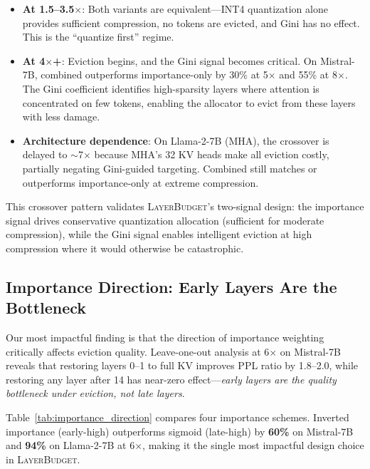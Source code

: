 \documentclass{article}
\newcommand{\layerbudget}{\textsc{LayerBudget}\xspace}
\begin{document}
\begin{itemize}
    \item \textbf{At 1.5--3.5$\times$}: Both variants are equivalent---INT4 quantization alone provides sufficient compression, no tokens are evicted, and Gini has no effect.
    This is the ``quantize first'' regime.
    \item \textbf{At 4$\times$+}: Eviction begins, and the Gini signal becomes critical.
    On Mistral-7B, combined outperforms importance-only by 30\% at 5$\times$ and 55\% at 8$\times$.
    The Gini coefficient identifies high-sparsity layers where attention is concentrated on few tokens, enabling the allocator to evict from these layers with less damage.
    \item \textbf{Architecture dependence}: On Llama-2-7B (MHA), the crossover is delayed to $\sim$7$\times$ because MHA's 32 KV heads make all eviction costly, partially negating Gini-guided targeting.
    Combined still matches or outperforms importance-only at extreme compression.
\end{itemize}

This crossover pattern validates \layerbudget's two-signal design: the importance signal drives conservative quantization allocation (sufficient for moderate compression), while the Gini signal enables intelligent eviction at high compression where it would otherwise be catastrophic.

\subsection{Importance Direction: Early Layers Are the Bottleneck}
\label{sec:importance_direction}

Our most impactful finding is that the direction of importance weighting critically affects eviction quality.
Leave-one-out analysis at 6$\times$ on Mistral-7B reveals that restoring layers 0--1 to full KV improves PPL ratio by 1.8--2.0, while restoring any layer after 14 has near-zero effect---\emph{early layers are the quality bottleneck under eviction, not late layers}.

Table~\ref{tab:importance_direction} compares four importance schemes.
Inverted importance (early-high) outperforms sigmoid (late-high) by \textbf{60\%} on Mistral-7B and \textbf{94\%} on Llama-2-7B at 6$\times$, making it the single most impactful design choice in \layerbudget.
\end{document}
